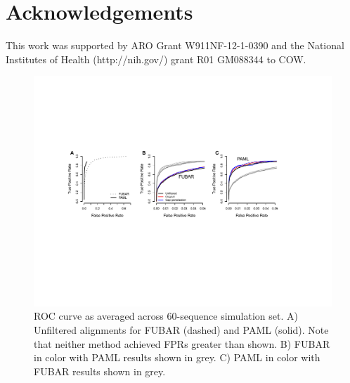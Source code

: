 \documentclass[11pt]{article}
\begin{document}
\section*{Acknowledgements}
This work was supported by ARO Grant W911NF-12-1-0390 and the National Institutes of Health (http://nih.gov/) grant R01 GM088344 to COW.


\begin{figure}[H]
\centerline{\includegraphics[width=6.75in]{Figures/roc.pdf}}
\caption{\label{roc} ROC curve as averaged across 60-sequence simulation set. A) Unfiltered alignments for FUBAR (dashed) and PAML (solid). Note that neither method achieved FPRs greater than shown. B) FUBAR in color with PAML results shown in grey. C) PAML in color with FUBAR results shown in grey.}
\end{figure}

\bigskip
\end{document}
